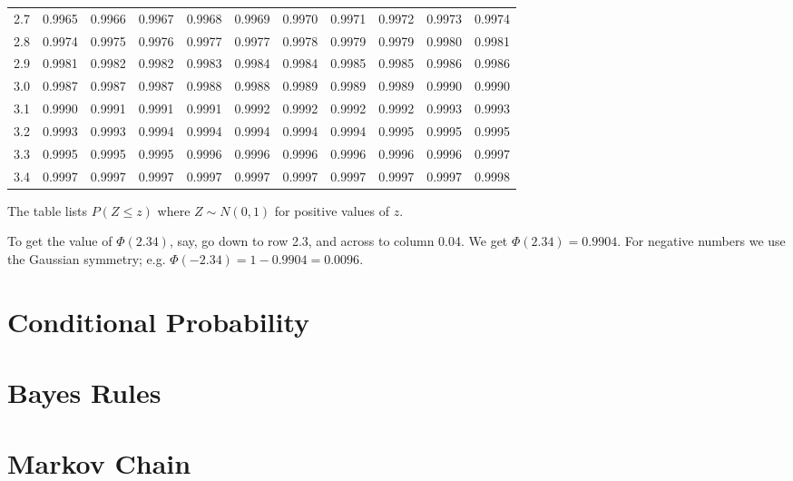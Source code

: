 \documentclass[11pt]{article}
\begin{document}
\begin{table}[h]
\begin{center}
\begin{tabular}{c | rrrrr | rrrrr |}
  2.7 & \scriptsize{0.9965} & \scriptsize{0.9966} & \scriptsize{0.9967} & \scriptsize{0.9968} & \scriptsize{0.9969} & \scriptsize{0.9970} & \scriptsize{0.9971} & \scriptsize{0.9972} & \scriptsize{0.9973} & \scriptsize{0.9974} \\
  2.8 & \scriptsize{0.9974} & \scriptsize{0.9975} & \scriptsize{0.9976} & \scriptsize{0.9977} & \scriptsize{0.9977} & \scriptsize{0.9978} & \scriptsize{0.9979} & \scriptsize{0.9979} & \scriptsize{0.9980} & \scriptsize{0.9981} \\
  2.9 & \scriptsize{0.9981} & \scriptsize{0.9982} & \scriptsize{0.9982} & \scriptsize{0.9983} & \scriptsize{0.9984} & \scriptsize{0.9984} & \scriptsize{0.9985} & \scriptsize{0.9985} & \scriptsize{0.9986} & \scriptsize{0.9986} \\
  \hline
  \hline
  3.0 & \scriptsize{0.9987} & \scriptsize{0.9987} & \scriptsize{0.9987} & \scriptsize{0.9988} & \scriptsize{0.9988} & \scriptsize{0.9989} & \scriptsize{0.9989} & \scriptsize{0.9989} & \scriptsize{0.9990} & \scriptsize{0.9990} \\
  3.1 & \scriptsize{0.9990} & \scriptsize{0.9991} & \scriptsize{0.9991} & \scriptsize{0.9991} & \scriptsize{0.9992} & \scriptsize{0.9992} & \scriptsize{0.9992} & \scriptsize{0.9992} & \scriptsize{0.9993} & \scriptsize{0.9993} \\
  3.2 & \scriptsize{0.9993} & \scriptsize{0.9993} & \scriptsize{0.9994} & \scriptsize{0.9994} & \scriptsize{0.9994} & \scriptsize{0.9994} & \scriptsize{0.9994} & \scriptsize{0.9995} & \scriptsize{0.9995} & \scriptsize{0.9995} \\
  3.3 & \scriptsize{0.9995} & \scriptsize{0.9995} & \scriptsize{0.9995} & \scriptsize{0.9996} & \scriptsize{0.9996} & \scriptsize{0.9996} & \scriptsize{0.9996} & \scriptsize{0.9996} & \scriptsize{0.9996} & \scriptsize{0.9997} \\
  3.4 & \scriptsize{0.9997} & \scriptsize{0.9997} & \scriptsize{0.9997} & \scriptsize{0.9997} & \scriptsize{0.9997} & \scriptsize{0.9997} & \scriptsize{0.9997} & \scriptsize{0.9997} & \scriptsize{0.9997} & \scriptsize{0.9998} \\
   \hline
\end{tabular}
\end{center}
\end{table}
\noindent The table lists $P(Z\le z)$ where $Z \sim N(0,1)$ for positive values of $z$. 

To get the value of $\Phi(2.34)$, say, go down to row 2.3, and across to column 0.04. We get $\Phi(2.34)=0.9904$. For negative numbers we use the Gaussian symmetry; e.g. $\Phi(-2.34)=1-0.9904 = 0.0096$.


\section{Conditional Probability}
\section{Bayes Rules}
\section{Markov Chain}
\end{document}
